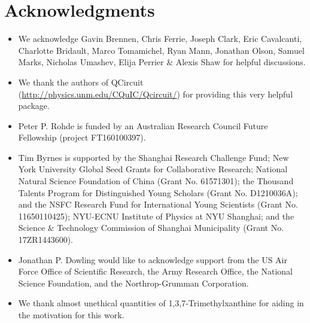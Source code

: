 %
%

\section*{Acknowledgments}

\begin{itemize}
\item We acknowledge Gavin Brennen, Chris Ferrie, Joseph Clark, Eric Cavalcanti, Charlotte Bridault, Marco Tomamichel, Ryan Mann, Jonathan Olson, Samuel Marks, Nicholas Umashev, Elija Perrier \& Alexis Shaw for helpful discussions.
\item We thank the authors of QCircuit (\href{http://physics.unm.edu/CQuIC/Qcircuit/}{http://physics.unm.edu/CQuIC/Qcircuit/}) for providing this very helpful package.
\item Peter P. Rohde is funded by an Australian Research Council Future Fellowship (project FT160100397).
\item Tim Byrnes is supported by the Shanghai Research Challenge Fund; New York University Global Seed Grants for Collaborative Research; National Natural Science Foundation of China (Grant No. 61571301); the Thousand Talents Program for Distinguished Young Scholars (Grant No. D1210036A); and the NSFC Research Fund for International Young Scientists (Grant No. 11650110425); NYU-ECNU Institute of Physics at NYU Shanghai; and the Science \& Technology Commission of Shanghai Municipality (Grant No. 17ZR1443600).
\item Jonathan P. Dowling would like to acknowledge support from the US Air Force Office of Scientific Research, the Army Research Office, the National Science Foundation, and the Northrop-Grumman Corporation.
\item We thank almost unethical quantities of 1,3,7-Trimethylxanthine for aiding in the motivation for this work.
\end{itemize}